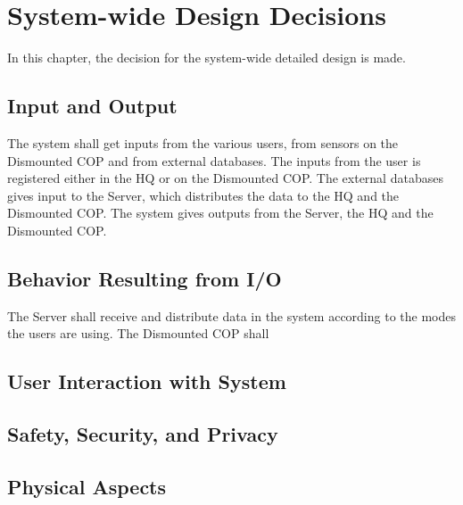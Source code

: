 \chapter{System-wide Design Decisions}

In this chapter, the decision for the system-wide detailed design is made.

\section{Input and Output}
The system shall get inputs from the various users, from sensors on the Dismounted COP and from external databases. The inputs from the user is registered either in the HQ or on the Dismounted COP. The external databases gives input to the Server, which distributes the data to the HQ and the Dismounted COP. The system gives outputs from the Server, the HQ and the Dismounted COP. 

\section{Behavior Resulting from I/O}
The Server shall receive and distribute data in the system according to the modes the users are using. The Dismounted COP shall 

\section{User Interaction with System}

\section{Safety, Security, and Privacy}

\section{Physical Aspects}

